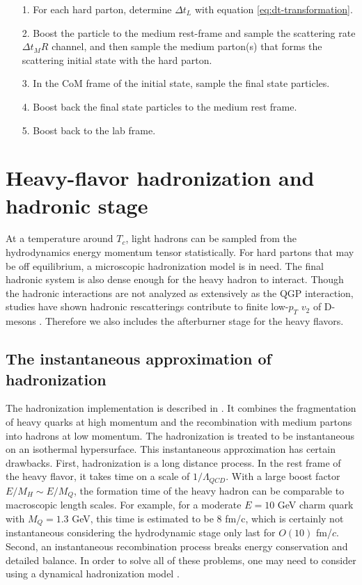 \begin{itemize}
\item[1.] For each hard parton, determine $\Delta t_L$ with equation \ref{eq:dt-transformation}.
\item[2.] Boost the particle to the medium rest-frame and sample the scattering rate $\Delta t_M R$ channel, and then sample the medium parton(s) that forms the scattering initial state with the hard parton.
\item[3.] In the CoM frame of the initial state, sample the final state particles.
\item[4.] Boost back the final state particles to the medium rest frame.
\item[5.] Boost back to the lab frame.
\end{itemize}

\section{Heavy-flavor hadronization and hadronic stage}
\label{section:hadronization}
At a temperature around $T_c$, light hadrons can be sampled from the hydrodynamics energy momentum tensor statistically.
For hard partons that may be off equilibrium, a microscopic hadronization model is in need.
The final hadronic system is also dense enough for the heavy hadron to interact.
Though the hadronic interactions are not analyzed as extensively as the QGP interaction, studies have shown hadronic rescatterings contribute to finite low-$p_T$ $v_2$ of D-mesons \cite{Cao:2015hia}.
Therefore we also includes the afterburner stage for the heavy flavors.

\subsection{The instantaneous approximation of hadronization} 
The hadronization implementation is described in \cite{Cao:2013ita}.
It combines the fragmentation of heavy quarks at high momentum and the recombination with medium partons into hadrons at low momentum.
The hadronization is treated to be instantaneous on an isothermal hypersurface.
This instantaneous approximation has certain drawbacks.
First, hadronization is a long distance process. 
In the rest frame of the heavy flavor, it takes time on a scale of $1/\Lambda_{QCD}$. 
With a large boost factor $E/M_H\sim E/M_Q$, the formation time of the heavy hadron can be comparable to macroscopic length scales.
For example, for a moderate $E=10$ GeV charm quark with $M_Q=1.3$ GeV, this time is estimated to be $8$ fm/c, which is certainly not instantaneous considering the hydrodynamic stage only last for $O(10)$ fm/$c$.
Second, an instantaneous recombination process breaks energy conservation and detailed balance.
In order to solve all of these problems, one may need to consider using a dynamical hadronization model \cite{He:2019vgs}.

